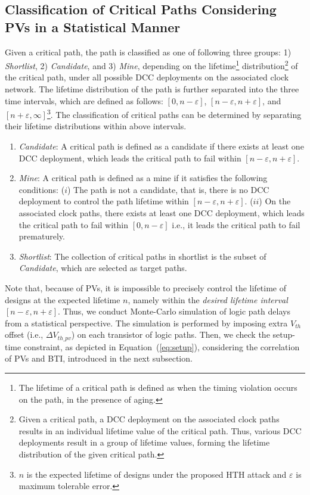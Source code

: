 \subsection{Classification of Critical Paths Considering PVs in a Statistical Manner}
\label{sec:frame:cp}
Given a critical path, the path is classified as one of following three groups: 1) \textit{Shortlist}, 2) \textit{Candidate}, and 3) \textit{Mine}, depending on the lifetime\footnote{The lifetime of a critical path is defined as when the timing violation occurs on the path, in the presence of aging.} distribution\footnote{Given a critical path, a DCC deployment on the associated clock paths results in an individual lifetime value of the critical path. Thus, various DCC deployments result in a group of lifetime values, forming the lifetime distribution of the given critical path.} of the critical path, under all possible DCC deployments on the associated clock network. The lifetime distribution of the path is further separated into the three time intervals, which are defined as follows: $[0, n - \varepsilon]$, $[n - \varepsilon, n + \varepsilon]$, and $[n + \varepsilon, \infty]$\footnote{$n$ is the expected lifetime of designs under the proposed HTH attack and $\varepsilon$ is maximum tolerable error.}. The classification of critical paths can be determined by separating their lifetime distributions within above intervals. 
\begin{enumerate}[leftmargin=*]%
	\item \textit{Candidate}: A critical path is defined as a candidate if there exists at least one DCC deployment, which leads the critical path to fail within $[n - \varepsilon, n + \varepsilon]$.
	\item \textit{Mine}: A critical path is defined as a mine if it satisfies the following conditions: ($i$) The path is not a candidate, that is, there is no DCC deployment to control the path lifetime within $[n - \varepsilon, n + \varepsilon]$. ($ii$) On the associated clock paths, there exists at least one DCC deployment, which leads the critical path to fail within $[0, n - \varepsilon]$ i.e., it leads the critical path to fail prematurely.
	\item \textit{Shortlist}:  The collection of critical paths in shortlist is the subset of \textit{Candidate}, which are selected as target paths.
\end{enumerate}

Note that, because of PVs, it is impossible to precisely control the lifetime of designs at the expected lifetime $n$, namely within the \textit{desired lifetime interval}  $[n - \varepsilon, n + \varepsilon]$. Thus, we conduct Monte-Carlo simulation of logic path delays from a statistical perspective. The simulation is performed by imposing extra $V_{th}$ offset (i.e., $\Delta V_{th\_pv}$) on each transistor of logic paths. Then, we check the setup-time constraint, as depicted in Equation~(\ref{eq:setup}), considering the correlation of PVs and BTI, introduced in the next subsection. 

